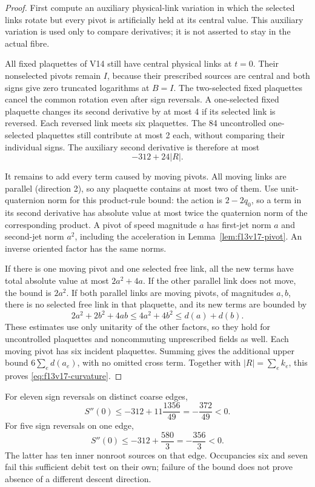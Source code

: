 \documentclass[11pt,oneside]{article}
\begin{document}
\begin{proof}
First compute an auxiliary physical-link variation
in which the selected links rotate but every pivot
is artificially held at its central value. This
auxiliary variation is used only to compare derivatives;
it is not asserted to stay in the actual fibre.

All fixed plaquettes of V14 still have central
physical links at \(t=0\). Their nonselected pivots
remain \(I\), because their prescribed sources
are central and both signs give zero truncated
logarithms at \(B=I\). The two-selected fixed
plaquettes cancel the common rotation even after
sign reversals. A one-selected fixed plaquette
changes its second derivative by at most 4 if its
selected link is reversed. Each reversed link
meets six plaquettes. The 84 uncontrolled
one-selected plaquettes still contribute at most
2 each, without comparing their individual signs.
The auxiliary second derivative is therefore at most
\[
                           -312+24|R|.
\]

It remains to add every term caused by moving
pivots. All moving links are parallel (direction 2),
so any plaquette contains at most two of them.
Use unit-quaternion norm for this product-rule
bound: the action is \(2-2q_0\), so a term in its
second derivative has absolute value at most twice
the quaternion norm of the corresponding product.
A pivot of speed magnitude \(a\) has first-jet
norm \(a\) and second-jet norm \(a^2\), including
the acceleration in Lemma~\ref{lem:f13v17-pivot}.
An inverse oriented factor has the same norms.

If there is one moving pivot and one selected
free link, all the new terms have total absolute
value at most \(2a^2+4a\). If the other parallel
link does not move, the bound is \(2a^2\).
If both parallel links are moving pivots, of
magnitudes \(a,b\), there is no selected free
link in that plaquette, and its new terms are bounded by
\[
 2a^2+2b^2+4ab
               \le4a^2+4b^2\le d(a)+d(b).
\]
These estimates use only unitarity of the other
factors, so they hold for uncontrolled plaquettes
and noncommuting unprescribed fields as well.
Each moving pivot has six incident plaquettes.
Summing gives the additional upper bound
\(6\sum_e d(a_e)\), with no omitted cross term.
Together with \(|R|=\sum_e k_e\), this proves
\eqref{eq:f13v17-curvature}.
\end{proof}

For eleven sign reversals on distinct coarse edges,
\[
 S''(0)\le-312+11\frac{1356}{49}
                         =-\frac{372}{49}<0.
\]
For five sign reversals on one edge,
\[
 S''(0)\le-312+\frac{580}{3}
                         =-\frac{356}{3}<0.
\]
The latter has ten inner nonroot sources on that
edge. Occupancies six and seven fail this sufficient
debit test on their own; failure of the bound does
not prove absence of a different descent direction.
\end{document}

